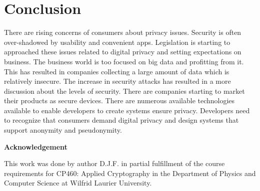 \documentclass[12pt]{article}
\begin{document}
\section{Conclusion}\label{sec:conclusion}
There are rising concerns of consumers about privacy issues. Security is often over-shadowed by usability and convenient apps. Legislation is starting to approached these issues related to digital privacy and setting expectations on business. The business world is too focused on big data and profitting from it. This has resulted in companies collecting a large amount of data which is relatively insecure. The increase in security attacks has resulted in a more discussion about the levels of security. There are companies starting to market their products as secure devices. There are numerous available technologies available to enable developers to create systems ensure privacy. Developers need to recognize that consumers demand digital privacy and design systems that support anonymity and pseudonymity.

\begin{center}
{\bf Acknowledgement}
\end{center}
This work was done by author D.J.F. in partial fulfillment of the course requirements for CP460: Applied Cryptography in the Department of Physics and Computer Science at Wilfrid Laurier University.
\end{document}
